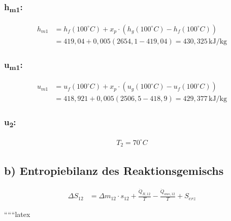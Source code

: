 \subsubsection*{h\textsubscript{m1}:}
\begin{align*}
h_{m1} &= h_{f}(100^\circ C) + x_p \cdot \left( h_{g}(100^\circ C) - h_{f}(100^\circ C) \right) \\
&= 419,04 + 0,005 \left( 2654,1 - 419,04 \right) = 430,325 \, \text{kJ/kg}
\end{align*}

\subsubsection*{u\textsubscript{m1}:}
\begin{align*}
u_{m1} &= u_{f}(100^\circ C) + x_p \cdot \left( u_{g}(100^\circ C) - u_{f}(100^\circ C) \right) \\
&= 418,921 + 0,005 \left( 2506,5 - 418,9 \right) = 429,377 \, \text{kJ/kg}
\end{align*}

\subsubsection*{u\textsubscript{2}:}
\begin{align*}
T_2 = 70^\circ C
\end{align*}

\subsection*{b) Entropiebilanz des Reaktionsgemischs}

\begin{align*}
\Delta S_{12} &= \Delta m_{12} \cdot s_{12} + \frac{\dot{Q}_{R,12}}{T} - \frac{\dot{Q}_{aus,12}}{T} + S_{erz}
\end{align*}

``````latex


